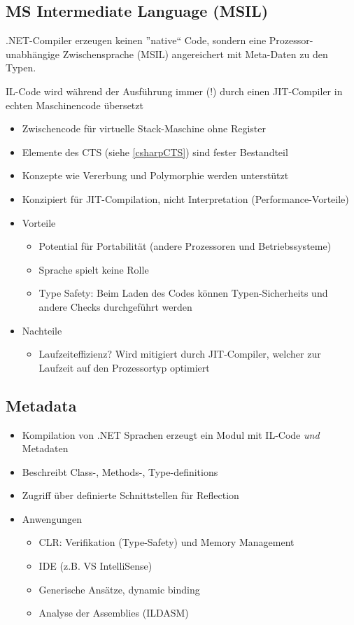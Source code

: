 \subsection{MS Intermediate Language (MSIL)}
.NET-Compiler erzeugen keinen ''native`` Code, sondern eine
Prozessor-unabhängige Zwischensprache (MSIL) angereichert mit
Meta-Daten zu den Typen.

IL-Code wird während der Ausführung immer (!) durch einen JIT-Compiler
in echten Maschinencode übersetzt

\begin{itemize}
	\item Zwischencode für virtuelle Stack-Maschine ohne Register
	\item Elemente des CTS (siehe \ref{csharpCTS}) sind fester Bestandteil
	\item Konzepte wie Vererbung und Polymorphie werden unterstützt
	\item Konzipiert für JIT-Compilation, nicht Interpretation (Performance-Vorteile)
	\item Vorteile
		\begin{itemize}
			\item Potential für Portabilität (andere Prozessoren und Betriebssysteme)
			\item Sprache spielt keine Rolle
			\item Type Safety: Beim Laden des Codes können Typen-Sicherheits und andere Checks durchgeführt werden
		\end{itemize}
	\item Nachteile
		\begin{itemize}
			\item Laufzeiteffizienz? Wird mitigiert durch JIT-Compiler, welcher zur Laufzeit auf den Prozessortyp optimiert
		\end{itemize}

\end{itemize}

\subsection{Metadata}
\begin{itemize}
	\item Kompilation von .NET Sprachen erzeugt ein Modul mit IL-Code \emph{und} Metadaten
	\item Beschreibt Class-, Methods-, Type-definitions
	\item Zugriff über definierte Schnittstellen für Reflection
	\item Anwengungen
		\begin{itemize}
			\item CLR: Verifikation (Type-Safety) und Memory Management
			\item IDE (z.B. VS IntelliSense)
			\item Generische Ansätze, dynamic binding
			\item Analyse der Assemblies (ILDASM)
		\end{itemize}
\end{itemize}

